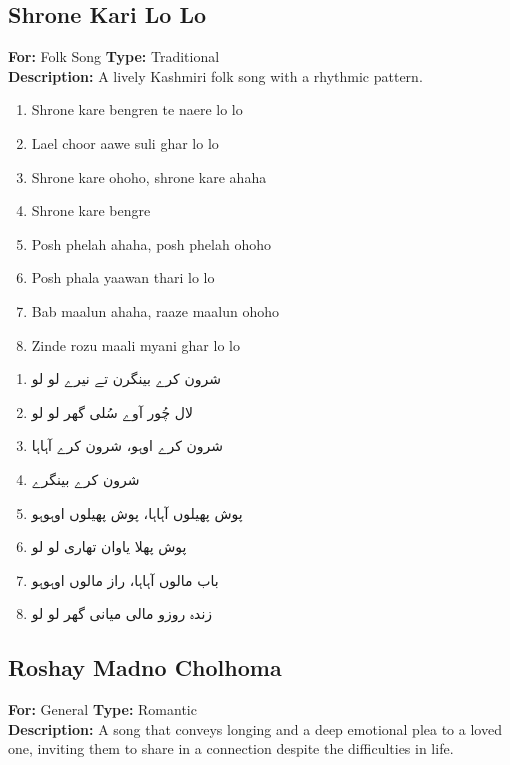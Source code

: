 \documentclass[12pt]{article}
\newcommand{\bigroman}[1]{\fontsize{16pt}{18pt}\selectfont\RaggedRight #1}
\newcommand{\bigarabic}[1]{\fontsize{16pt}{18pt}\selectfont \textarabic{#1}}
\begin{document}
\subsection*{Shrone Kari Lo Lo}
\textbf{For:} Folk Song \quad \textbf{Type:} Traditional\\
\textbf{Description:} A lively Kashmiri folk song with a rhythmic pattern.

\begin{multicols}{2}
\begin{enumerate}[leftmargin=*, label=\arabic*., font=\fontsize{16pt}{18pt}\selectfont]
  \item \bigroman{Shrone kare bengren te naere lo lo}
  \item \bigroman{Lael choor aawe suli ghar lo lo}
  \item \bigroman{Shrone kare ohoho, shrone kare ahaha}
  \item \bigroman{Shrone kare bengre}
  \item \bigroman{Posh phelah ahaha, posh phelah ohoho}
  \item \bigroman{Posh phala yaawan thari lo lo}
  \item \bigroman{Bab maalun ahaha, raaze maalun ohoho}
  \item \bigroman{Zinde rozu maali myani ghar lo lo}
\end{enumerate}

\columnbreak

\begin{RTL}
\begin{enumerate}[leftmargin=*, label=\arabic*., font=\fontsize{16pt}{18pt}\selectfont]
  \item \bigarabic{شرون کرے بینگرن تے نیرے لو لو}
  \item \bigarabic{لال چُور آوے سُلی گھر لو لو}
  \item \bigarabic{شرون کرے اوہو، شرون کرے آہاہا}
  \item \bigarabic{شرون کرے بینگرے}
  \item \bigarabic{پوش پھیلوں آہاہا، پوش پھیلوں اوہوہو}
  \item \bigarabic{پوش پھلا یاوان تھاری لو لو}
  \item \bigarabic{باب مالوں آہاہا، راز مالوں اوہوہو}
  \item \bigarabic{زندہ روزو مالی میانی گھر لو لو}
\end{enumerate}
\end{RTL}
\end{multicols}
\subsection*{Roshay Madno Cholhoma}
\textbf{For:} General \quad \textbf{Type:} Romantic\\
\textbf{Description:} A song that conveys longing and a deep emotional plea to a loved one, inviting them to share in a connection despite the difficulties in life.
\end{document}
